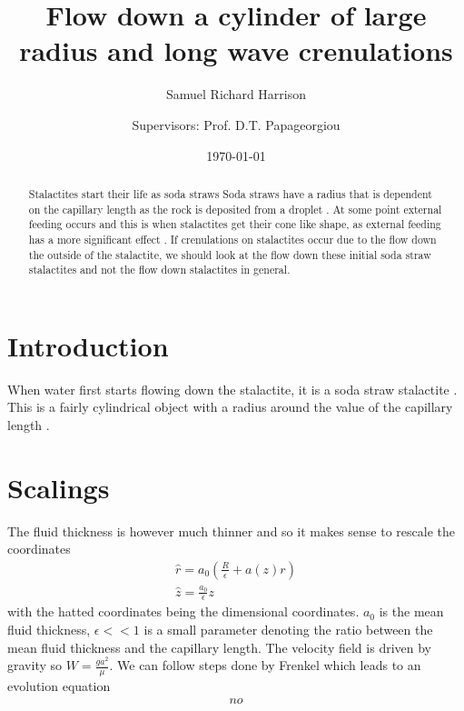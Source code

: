 \documentclass[12pt]{article}
\title{Flow down a cylinder of large radius and long wave crenulations}
\author[1,2]{Samuel Richard Harrison}
\author[2]{\authorcr Supervisors: Prof. D.T. Papageorgiou}
\affil[1]{ University of Reading}
\affil[2]{Imperial College London}
\date{\today}
\begin{document}
\maketitle

\begin{abstract}
	Stalactites start their life as soda straws \cite{hill1997cave}
	Soda straws have a radius that is dependent on the capillary length as the rock is deposited from a droplet \cite{curl1972minimum}. At some point external feeding occurs and this is when stalactites get their cone like shape, as external feeding has a more significant effect \cite{maltsev1999stalactites}. If crenulations on stalactites occur due to the flow down the outside of the stalactite, we should look at the flow down these initial soda straw stalactites and not the flow down stalactites in general.
\end{abstract}
\section{Introduction}
When water first starts flowing down the stalactite, it is a soda straw stalactite \cite{hill1997cave}. This is a fairly cylindrical object with a radius around the value of the capillary length \cite{curl1972minimum}. 
\section{Scalings}
The fluid thickness is however much thinner \cite{short} and so it makes sense to rescale the coordinates 
\begin{align}
\hat{r} = a_0\left(\frac{R}{\epsilon}+ a(z) r\right)\\
\hat{z} =\frac{ a_0}{\epsilon}z
\end{align}
with the hatted coordinates being the dimensional coordinates. $a_0$ is the mean fluid thickness, $\epsilon<<1$ is a small parameter denoting the ratio between the mean fluid thickness and the capillary length. The velocity field is driven by gravity so $W = \frac{g a^2}{\mu}$. We can follow steps done by Frenkel \cite{Frenkel_1992}which leads to an evolution equation 
\begin{align}
no 
\end{align}


\end{document}
